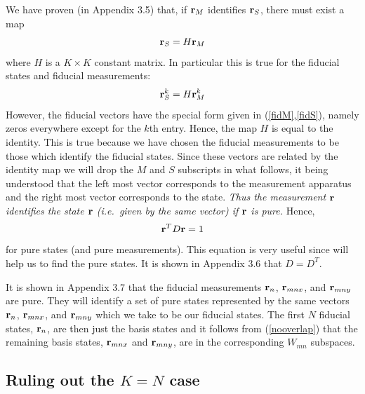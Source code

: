 \documentclass[10pt,twocolumn]{article}
\begin{document}
We have proven (in Appendix 3.5)
that, if ${\bf r}_M$ identifies ${\bf r}_S$, there must exist a map
\begin{equation}
{\bf r}_S = H {\bf r}_M
\end{equation}
where $H$ is a $K\times K$ constant matrix.  In particular this is true for
the fiducial states and fiducial measurements:
\begin{equation}
{\bf r}^k_S = H {\bf r}^k_M
\end{equation}
However, the fiducial vectors have the special form given in
(\ref{fidM},\ref{fidS}), namely zeros everywhere except for the $k$th
entry.  Hence, the map $H$ is equal to the identity.
This is true because we have chosen the fiducial measurements to be
those which identify the fiducial states. Since these vectors are
related by the identity map we will drop the $M$ and $S$
subscripts in what follows, it being understood that the left most
vector corresponds to the measurement apparatus and the right most vector
corresponds to the state.  {\it Thus the measurement ${\bf r}$ identifies the
state ${\bf r}$ (i.e.\ given by the same vector) if ${\bf r}$ is pure.}  Hence,
\begin{equation}
{\bf r}^T D {\bf r}=1
\end{equation}
for pure states (and pure measurements).
This equation is very useful since will help us to find the pure states.
It is shown in Appendix 3.6 that $D=D^T$.

It is shown in Appendix 3.7 that the fiducial measurements ${\bf r}_n$,
${\bf r}_{mnx}$, and ${\bf r}_{mny}$ are pure.  They will identify a set
of pure states represented by the same vectors ${\bf r}_n$,
${\bf r}_{mnx}$, and ${\bf r}_{mny}$ which we take to be our fiducial
states.  The first $N$ fiducial states, ${\bf r}_n$, are then just the
basis states and it follows from (\ref{nooverlap}) that the remaining
basis states, ${\bf r}_{mnx}$ and ${\bf r}_{mny}$, are in the
corresponding $W_{mn}$ subspaces.


\subsection{Ruling out the $K=N$ case}\label{notclassical}
\end{document}
